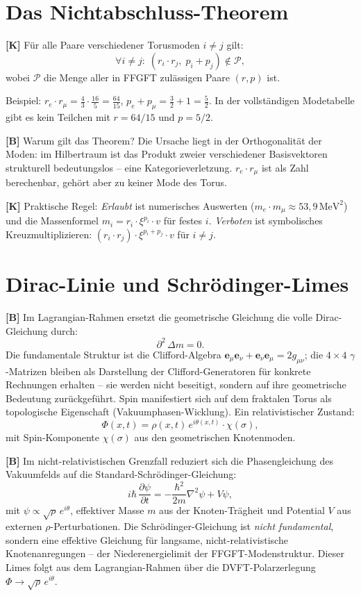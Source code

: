 \section{Das Nichtabschluss-Theorem}

\textbf{[K]} Für alle Paare verschiedener Torusmoden $i\neq j$ gilt:
\[
  \forall i\neq j:\; (r_i\cdot r_j,\; p_i+p_j)\notin\mathcal P,
\]
wobei $\mathcal P$ die Menge aller in FFGFT zulässigen Paare $(r,p)$ ist.

Beispiel: $r_e\cdot r_\mu = \tfrac43\cdot\tfrac{16}{5} = \tfrac{64}{15}$,
$p_e+p_\mu = \tfrac32+1 = \tfrac52$. In der vollständigen Modetabelle gibt es
kein Teilchen mit $r=64/15$ und $p=5/2$.

\textbf{[B]} Warum gilt das Theorem? Die Ursache liegt in der Orthogonalität der
Moden: im Hilbertraum ist das Produkt zweier verschiedener Basisvektoren
strukturell bedeutungslos -- eine Kategorieverletzung. $r_e\cdot r_\mu$ ist als
Zahl berechenbar, gehört aber zu keiner Mode des Torus.

\textbf{[K]} Praktische Regel: \emph{Erlaubt} ist numerisches Auswerten
($m_e\cdot m_\mu\approx53{,}9\,\text{MeV}^2$) und die Massenformel
$m_i=r_i\cdot\xi^{p_i}\cdot v$ für festes $i$. \emph{Verboten} ist symbolisches
Kreuzmultiplizieren: $(r_i\cdot r_j)\cdot\xi^{p_i+p_j}\cdot v$ für $i\neq j$.

\section{Dirac-Linie und Schrödinger-Limes}

\textbf{[B]} Im Lagrangian-Rahmen ersetzt die geometrische Gleichung die volle
Dirac-Gleichung durch:
\[
  \partial^2\,\Delta m = 0.
\]
Die fundamentale Struktur ist die Clifford-Algebra
$\mathbf e_\mu\mathbf e_\nu+\mathbf e_\nu\mathbf e_\mu=2g_{\mu\nu}$; die
$4\times4$ $\gamma$-Matrizen bleiben als Darstellung der Clifford-Generatoren für
konkrete Rechnungen erhalten -- sie werden nicht beseitigt, sondern auf ihre
geometrische Bedeutung zurückgeführt. Spin manifestiert sich auf dem fraktalen
Torus als topologische Eigenschaft (Vakuumphasen-Wicklung). Ein relativistischer
Zustand:
\[
  \Phi(x,t) = \rho(x,t)\,e^{i\theta(x,t)}\cdot\chi(\sigma),
\]
mit Spin-Komponente $\chi(\sigma)$ aus den geometrischen Knotenmoden.

\textbf{[B]} Im nicht-relativistischen Grenzfall reduziert sich die
Phasengleichung des Vakuumfelds auf die Standard-Schrödinger-Gleichung:
\[
  i\hbar\,\frac{\partial\psi}{\partial t}
  = -\frac{\hbar^2}{2m}\nabla^2\psi + V\psi,
\]
mit $\psi\propto\sqrt\rho\,e^{i\theta}$, effektiver Masse $m$ aus der
Knoten-Trägheit und Potential $V$ aus externen $\rho$-Perturbationen. Die
Schrödinger-Gleichung ist \emph{nicht fundamental}, sondern eine effektive
Gleichung für langsame, nicht-relativistische Knotenanregungen -- der
Niederenergielimit der FFGFT-Modenstruktur. Dieser Limes folgt aus dem
Lagrangian-Rahmen über die DVFT-Polarzerlegung $\Phi\to\sqrt\rho\,e^{i\theta}$.

